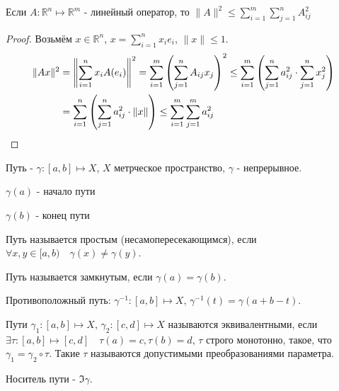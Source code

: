 \begin{theorem} \thmslashn

    Если $A : \mathbb{R}^{n} \mapsto \mathbb{R}^{m}$ - линейный оператор, то $\|A\|^2 \le \sum\limits_{i=1}^{m}\sum\limits_{j=1}^{n}A_{ij}^2$ 
    \begin{proof} \thmslashn

    Возьмём $x\in \mathbb{R}^{n}$, $x = \sum\limits_{i=1}^{n}x_{i}e_{i}$, $\|x\| \le 1$.
        \begin{equation*}
            \begin{split}
                \|Ax\|^2 
                &= \left\|\sum\limits_{i=1}^{n}x_{i}A(e_{i})\right\|^2 = \sum\limits_{i=1}^{m}\left( \sum\limits_{j=1}^{n} A_{ij}x_{j} \right)^2 \le \sum\limits_{i=1}^{m}\left( \sum\limits_{j=1}^{n} a_{ij}^2 \cdot  \sum\limits_{j=1}^{n} x_{j}^2 \right)\\
                &= \sum\limits_{i=1}^{n} \left( \sum\limits_{j=1}^{n} a_{ij}^2 \cdot  \|x\| \right) \le \sum\limits_{i=1}^{m}\sum\limits_{j=1}^{m} a_{ij}^2 \qedhere  
            \end{split}
        \end{equation*} 
    \end{proof}
\end{theorem}
\begin{definition}[Путь] \thmslashn 

    Путь - $\gamma : [a, b] \mapsto X$, $X$ метрческое пространство, $\gamma$ - непрерывное.

    $\gamma(a)$ - начало пути

    $\gamma(b)$ - конец пути

    Путь называется простым (несамопересекающимся), если $\forall{x, y\in [a, b)}\quad \gamma(x) \neq \gamma(y)$.

    Путь называется замкнутым, если $\gamma(a) = \gamma(b)$.

    Противоположный путь: $\gamma^{-1} : [a, b] \mapsto X$, $\gamma^{-1}(t) = \gamma(a+b-t)$.

    Пути $\gamma_1 : [a, b] \mapsto X$, $\gamma_2: [c, d] \mapsto X$ называются эквивалентными, если $\exists{\tau : [a, b] \mapsto [c, d]}\quad \tau(a) = c, \tau(b) = d$, $\tau$ строго монотонно, такое, что $\gamma_1 = \gamma_2 \circ \tau$. Такие $\tau$ называются допустимыми преобразованиями параметра.

    Носитель пути - $\Im \gamma$.
\end{definition}
